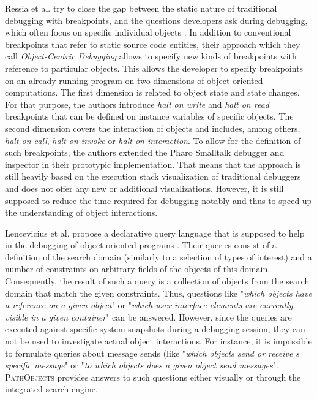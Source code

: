 Ressia et al. try to close the gap between the static nature of traditional  debugging with breakpoints, and the questions developers ask during debugging,  which often focus on specific individual objects \cite{ressia_object-centric_2012}.
In addition to conventional breakpoints that refer to static source code entities, their approach which they call \emph{Object-Centric Debugging} allows to specify new kinds of breakpoints with reference to particular objects.
 This allows the developer to specify breakpoints on an already running program on two dimensions of object oriented computations.
The first dimension is related to object state and state changes.
For that purpose, the authors introduce \emph{halt on write} and \emph{halt on read} breakpoints that can be defined on instance variables of specific objects.
The second dimension covers the interaction of objects and includes, among others, \emph{halt on call}, \emph{halt on invoke} or \emph{halt on interaction}.
To allow for the definition of such breakpoints, the authors extended the Pharo Smalltalk debugger and inspector in their prototypic implementation.
That means that the approach is still heavily based on the execution stack visualization of traditional debuggers and does not offer any new or additional visualizations.
However, it is still supposed to reduce the time required for debugging notably and thus to speed up the understanding of object interactions.

Lencevicius et al. propose a declarative query language that is supposed to help in the debugging of object-oriented programs \cite{lencevicius_query-based_1997, guerraoui_dynamic_1999}.
Their queries consist of a definition of the search domain (similarly to a selection of types of interest) and a number of constraints on arbitrary fields of the objects of this domain.
Consequently, the result of such a query is a collection of objects from the search domain that match the given constraints.
Thus, questions like "\textit{which objects have a reference on a given object}" or "\textit{which user interface elements are currently visible in a given container}" can be answered.
However, since the queries are executed against specific system snapshots during a debugging session, they can not be used to investigate actual object interactions.
For instance, it is impossible to formulate queries about message sends (like "\textit{which objects send or receive s specific message}" or "\textit{to which objects does a given object send messages}".
\textsc{PathObjects} provides answers to such questions either visually or through the integrated search engine.

